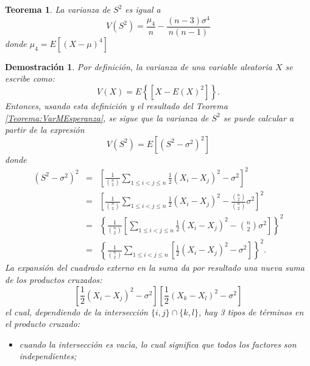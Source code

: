 \documentclass[a4paper,11pt]{article}
\theoremstyle{teoremas}
\newtheorem{teorema}{Teorema}[section]
\theoremstyle{ejemplos}
\theoremstyle{definiciones}
\theoremstyle{lemas}
\newtheorem*{demostracion}{Demostraci\'on}
\begin{document}
\begin{teorema} \label{Teorema:VarMVarianza}
 La varianza de $S^2$ es igual a
 \begin{equation} \label{Eq:VarMVarianza}
  V\left( S^2 \right) = \frac{\mu_4}{n} - \frac{(n-3)\sigma^4}{n(n-1)}
 \end{equation}
 donde $\mu_4 = E\left[ (X - \mu)^4 \right]$
\end{teorema}

\begin{demostracion}
 Por definici\'on, la varianza de una variable aleatoria $X$ se escribe como:
 \begin{equation*}
  V(X) = E\left\{ \left[ X - E(X)^2 \right] \right\}.
 \end{equation*}
 Entonces, usando esta definici\'on y el resultado del Teorema \ref{Teorema:VarMEsperanza}, se sigue que la varianza de $S^2$ se puede calcular a partir de la expresi\'on
 \begin{equation} \label{Eq:DefEsperanza}
  V\left( S^2 \right) = E\left[ \left( S^2 - \sigma^2 \right)^2 \right]
 \end{equation}
 donde
 \begin{eqnarray*}
  \left( S^2 - \sigma^2 \right)^2 & = & \left[ \frac{1}{\binom{n}{2}} \sum_{1\leq i < j \leq n} \frac{1}{2} \left( X_i - X_j \right)^2 - \sigma^2 \right]^2 \\ 
    & = & \left[ \frac{1}{\binom{n}{2}} \sum_{1\leq i < j \leq n} \frac{1}{2} \left( X_i - X_j \right)^2 - \frac{\binom{n}{2}}{\binom{n}{2}} \sigma^2 \right]^2 \\ 
    & = & \left\{ \frac{1}{\binom{n}{2}} \left[ \sum_{1\leq i < j \leq n} \frac{1}{2} \left( X_i - X_j \right)^2 - \binom{n}{2}\sigma^2 \right] \right\}^2 \\ 
    & = & \left\{ \frac{1}{\binom{n}{2}} \sum_{1\leq i<j\leq n} \left[ \frac{1}{2}\left( X_i - X_j \right)^2 - \sigma^2 \right] \right\}^2.
 \end{eqnarray*}
 La expansi\'on del cuadrado externo en la suma da por resultado una nueva suma de los productos cruzados:
 \begin{equation} \label{Eq:Expresion01}
  \left[ \frac{1}{2}\left( X_i - X_j \right)^2 - \sigma^2 \right] \left[ \frac{1}{2}\left( X_k - X_l \right)^2 - \sigma^2 \right]
 \end{equation}
 el cual, dependiendo de la intersecci\'on $\{ i,j\} \cap \{ k,l \}$, hay 3 tipos de t\'erminos en el producto cruzado:
 \begin{itemize}
  \item cuando la intersecci\'on es vac\'{\i}a, lo cual significa que todos los factores son independientes;

\end{itemize}
\end{demostracion}
\end{document}
